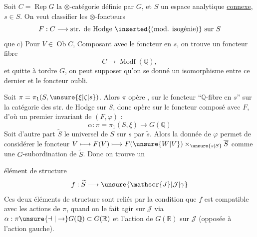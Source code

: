 Soit $C=\operatorname{Rep}G$ la $\otimes$-catégorie définie par $G$, et $S$ un espace analytique \uline{connexe}, $s\in S$. On veut classifier les $\otimes$-foncteurs
\[
F:C\longrightarrow\text{str. de Hodge \inserted{(mod. isogénie)} sur }S
\]
 que c) Pour   $V\in\operatorname{Ob}C$,  
Composant avec le foncteur  en $s$, on trouve un foncteur fibre
\[
C\longrightarrow\operatorname{Modf}(\mathbb{Q}),
\]
et quitte à tordre $G$, on peut supposer qu'on se donné un isomorphisme \inserted{$\varphi$} entre ce dernier et le foncteur oubli.

 Soit $\pi=\pi_1(S,\unsure{\xi|\zeta|s})$. Alors $\pi$ opère , sur le foncteur  ``$\mathbb{Q}$-fibre en $s$'' sur la catégorie des str. de Hodge sur $S$, donc opère sur le foncteur composé avec $F$, d'où un premier invariant de $(F,\varphi)$ :
\[
\alpha:\pi=\pi_1(S,\xi)\longrightarrow G(\mathbb{Q})
\]
Soit d'autre part $\widetilde{S}$ le  universel de $S$   sur $s$ par $\widetilde{s}$. Alors la donnée de $\varphi$ permet de considérer le foncteur $V\longmapsto F(V)\longmapsto F(\unsure{W|V})\times_{\unsure{s|S}}\overline{S}$ comme une $G$-subordination de $\widetilde{S}$. Donc on trouve un

 élément de structure
\[
f:\widetilde{S}\longrightarrow\unsure{\mathscr{J}|\mathcal{J}|\gamma}
\]
Ces deux éléments de structure sont reliés par la condition que $f$ est compatible avec les actions de $\pi$, quand on le fait agir sur $\mathscr{J}$ via $\alpha:\pi\unsure{\dashv|\to}G(\mathbb{Q})\subset G(\mathbb{R})$ et l'action  de $G(\mathbb{R})$ sur $\mathscr{J}$ (opposée à l'action gauche).

